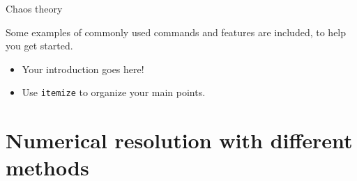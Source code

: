 \documentclass[10pt,xcolor={table,dvipsnames},t]{beamer}
\begin{document}
\begin{frame}{Chaos theory}

    Some examples of commonly used commands and features are included, to help you get started.
    \begin{itemize}
      \item Your introduction goes here!
      \item Use \texttt{itemize} to organize your main points.
    \end{itemize}

\end{frame}

\section{Numerical resolution with different methods}
\end{document}
